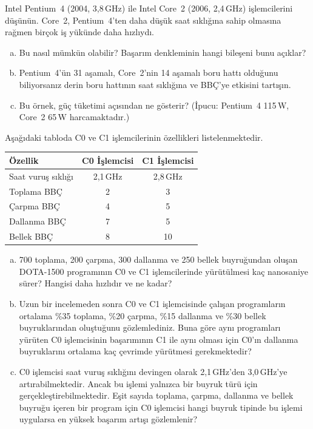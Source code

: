\begin{alistirma}[\zor]
Intel Pentium~4 (2004, 3,8\,GHz) ile Intel Core~2 (2006, 2,4\,GHz) işlemcilerini düşünün. Core~2, Pentium~4'ten daha düşük saat sıklığına sahip olmasına rağmen birçok iş yükünde daha hızlıydı.
\begin{enumerate}[(a)]
    \item Bu nasıl mümkün olabilir? Başarım denkleminin hangi bileşeni bunu açıklar?
    \item Pentium~4'ün 31 aşamalı, Core~2'nin 14 aşamalı boru hattı olduğunu biliyorsanız derin boru hattının saat sıklığına ve BBÇ'ye etkisini tartışın.
    \item Bu örnek, güç tüketimi açısından ne gösterir? (İpucu: Pentium~4 115\,W, Core~2 65\,W harcamaktadır.)
\end{enumerate}
\end{alistirma}

\begin{alistirma}[\zor]
Aşağıdaki tabloda C0 ve C1 işlemcilerinin özellikleri listelenmektedir.

\begin{center}
\begin{tabular}{lcc}
\toprule
\textbf{Özellik} & \textbf{C0 İşlemcisi} & \textbf{C1 İşlemcisi} \\
\midrule
Saat vuruş sıklığı & 2,1\,GHz & 2,8\,GHz \\
Toplama BBÇ & 2 & 3 \\
Çarpma BBÇ & 4 & 5 \\
Dallanma BBÇ & 7 & 5 \\
Bellek BBÇ & 8 & 10 \\
\bottomrule
\end{tabular}
\end{center}

\begin{enumerate}[(a)]
    \item 700 toplama, 200 çarpma, 300 dallanma ve 250 bellek buyruğundan oluşan DOTA-1500 programının C0 ve C1 işlemcilerinde yürütülmesi kaç nanosaniye sürer? Hangisi daha hızlıdır ve ne kadar?
    \item Uzun bir incelemeden sonra C0 ve C1 işlemcisinde çalışan programların ortalama \%35 toplama, \%20 çarpma, \%15 dallanma ve \%30 bellek buyruklarından oluştuğunu gözlemlediniz. Buna göre aynı programları yürüten C0 işlemcisinin başarımının C1 ile aynı olması için C0'ın dallanma buyruklarını ortalama kaç çevrimde yürütmesi gerekmektedir?
    \item C0 işlemcisi saat vuruş sıklığını devingen olarak 2,1\,GHz'den 3,0\,GHz'ye artırabilmektedir. Ancak bu işlemi yalnızca bir buyruk türü için gerçekleştirebilmektedir. Eşit sayıda toplama, çarpma, dallanma ve bellek buyruğu içeren bir program için C0 işlemcisi hangi buyruk tipinde bu işlemi uygularsa en yüksek başarım artışı gözlemlenir?
\end{enumerate}
\end{alistirma}

